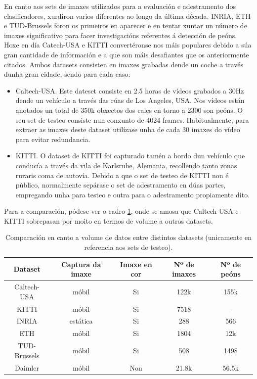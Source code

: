 \documentclass[galician]{./head/uvigo-tfg}
\begin{document}
    \par En canto aos sets de imaxes utilizados para a evaluación e adestramento dos clasificadores, xurdiron varios diferentes ao longo da última década. INRIA\cite{inria}, ETH\cite{ess2008mobile} e TUD-Brussels\cite{wojek2009multi} foron os primeiros en aparecer e en tentar xuntar un número de imaxes significativo para facer investigacións referentes á detección de peóns. Hoxe en día Catech-USA\cite{caltech} e KITTI\cite{kitti} convertéronse nos máis populares debido a súa gran cantidade de información e a que son máis desafiantes que os anteriormente citados. Ambos datasets consisten en imaxes grabadas dende un coche a través dunha gran cidade, sendo para cada caso:
    \begin{itemize}
        \item Caltech-USA. Este dateset consiste en 2.5 horas de vídeos grabados a 30Hz dende un vehículo a través das rúas de Los Angeles, USA. Nos vídeos están anotados un total de 350k obxectos dos cales en torno a 2300 son peóns. O seu set de testeo consiste nun conxunto de 4024 frames. Habitualmente, para extraer as imaxes deste dataset utilízase unha de cada 30 imaxes do vídeo para evitar redundancia.
        \item KITTI. O dataset de KITTI foi capturado tamén a bordo dun vehículo que conducía a través da vila de Karlsruhe, Alemania, recollendo tanto zonas ruraris coma de autovía. Debido a que o set de testeo de KITTI non é público, normalmente sepárase o set de adestramento en dúas partes, empregando unha para testeo e outra para o adestramento propiamente dito.
    \end{itemize}
    \par Para a comparación, pódese ver o cadro \ref{tab:datasetTab}, onde se amosa que Caltech-USA e KITTI sobrepasan por moito en termos de volume a outros datasets.
    \begin{table}[t]
    \centering
        \begin{tabular}{c c c c c}
        \hline
        Dataset & Captura da imaxe & Imaxe en cor & Nº de imaxes & Nº de peóns \\ \hline
        Caltech-USA & móbil & Si & 122k & 155k \\ 
        KITTI & móbil & Si & 7518 & - \\  
        INRIA & estática & Si & 288 & 566 \\  
        ETH & móbil & Si & 1804 & 12k \\ 
        TUD-Brussels & móbil & Si & 508 & 1498 \\
        Daimler & móbil & Non & 21.8k & 56.5k \\
        \end{tabular}
        \caption {Comparación en canto a volume de datos entre distintos datasets (unicamente en referencia aos sets de testeo).}
        \label{tab:datasetTab} 
    \end{table}
\end{document}
